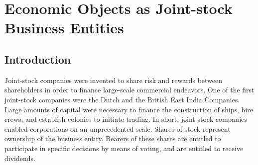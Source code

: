 






\chapter{Economic Objects as Joint-stock Business Entities}
\label{sec:jointstock}

\section{Introduction}

Joint-stock companies were invented to share risk and rewards between shareholders in order to finance large-scale commercial endeavors. One of the first joint-stock companies were the Dutch and the British East India Companies. Large amounts of capital were necessary to finance the construction of ships, hire crews, and establish colonies to initiate trading. In short, joint-stock companies enabled corporations on an unprecedented scale. Shares of stock represent  ownership of the business entity. Bearers of these shares are entitled to participate in specific decisions by means of voting, and are entitled to receive dividends. 

